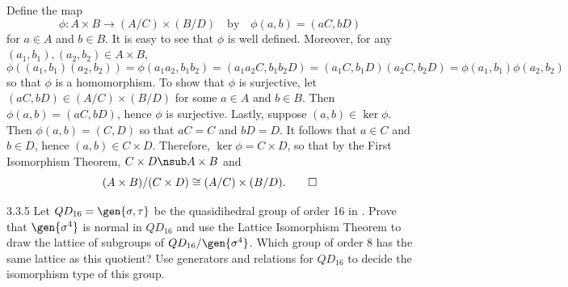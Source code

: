 \begin{sol}
    Define the map
    \[
    	\phi \colon A \times B \to (A/C) \times (B/D) \quad \text{by} \quad \phi(a, b) = (aC, bD)
    \]
    for $a \in A$ and $b \in B$.
	It is easy to see that $\phi$ is well defined.
	Moreover, for any $(a_1, b_1), (a_2, b_2) \in A \times B$,
    \[
    	\phi((a_1, b_1)(a_2, b_2)) = \phi(a_1a_2, b_1b_2) = (a_1a_2C, b_1b_2D) = (a_1C, b_1D)(a_2C, b_2D) = \phi(a_1, b_1) \phi(a_2, b_2)
    \]
    so that $\phi$ is a homomorphism.
	To show that $\phi$ is surjective, let $(aC, bD) \in (A/C) \times (B/D)$ for some $a \in A$ and $b \in B$.
	Then $\phi(a, b) = (aC, bD)$, hence $\phi$ is surjective.
	Lastly, suppose $(a, b) \in \ker\phi$.
	Then $\phi(a, b) = (C, D)$ so that $aC = C$ and $bD = D$.
	It follows that $a \in C$ and $b \in D$, hence $(a, b) \in C \times D$.
	Therefore, $\ker\phi = C \times D$, so that by the First Isomorphism Theorem, $C \times D \nsub A \times B$ and
    \[
    	(A \times B)/(C \times D) \cong (A/C) \times (B/D). \qedhere
    \]
\end{sol}

\begin{exercise}{3.3.5}
    Let $QD_{16} = \gen{\sigma, \tau}$ be the quasidihedral group of order 16 in .
	Prove that $\gen{\sigma^4}$ is normal in $QD_{16}$ and use the Lattice Isomorphism Theorem to draw the lattice of subgroups of $QD_{16}/\gen{\sigma^4}$.
	Which group of order 8 has the same lattice as this quotient?
	Use generators and relations for $QD_{16}$ to decide the isomorphism type of this group.
\end{exercise}

